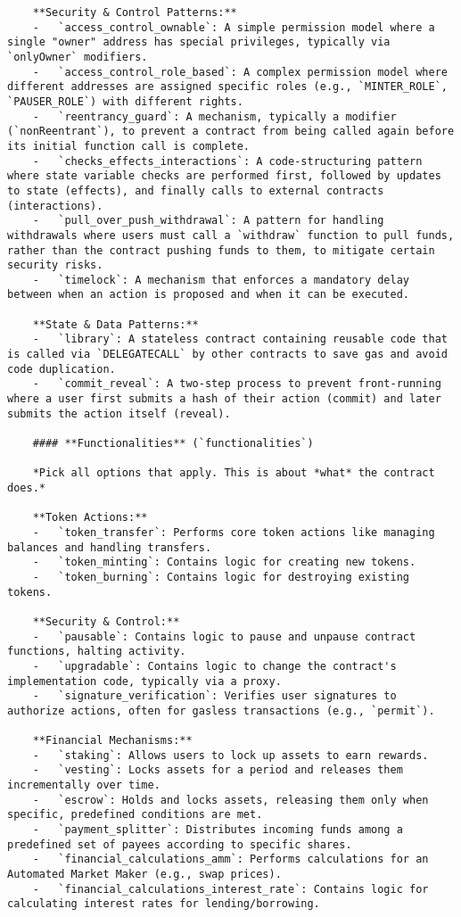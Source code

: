 \begin{lstlisting}
    **Security & Control Patterns:**
    -   `access_control_ownable`: A simple permission model where a single "owner" address has special privileges, typically via `onlyOwner` modifiers.
    -   `access_control_role_based`: A complex permission model where different addresses are assigned specific roles (e.g., `MINTER_ROLE`, `PAUSER_ROLE`) with different rights.
    -   `reentrancy_guard`: A mechanism, typically a modifier (`nonReentrant`), to prevent a contract from being called again before its initial function call is complete.
    -   `checks_effects_interactions`: A code-structuring pattern where state variable checks are performed first, followed by updates to state (effects), and finally calls to external contracts (interactions).
    -   `pull_over_push_withdrawal`: A pattern for handling withdrawals where users must call a `withdraw` function to pull funds, rather than the contract pushing funds to them, to mitigate certain security risks.
    -   `timelock`: A mechanism that enforces a mandatory delay between when an action is proposed and when it can be executed.

    **State & Data Patterns:**
    -   `library`: A stateless contract containing reusable code that is called via `DELEGATECALL` by other contracts to save gas and avoid code duplication.
    -   `commit_reveal`: A two-step process to prevent front-running where a user first submits a hash of their action (commit) and later submits the action itself (reveal).

    #### **Functionalities** (`functionalities`)

    *Pick all options that apply. This is about *what* the contract does.*

    **Token Actions:**
    -   `token_transfer`: Performs core token actions like managing balances and handling transfers.
    -   `token_minting`: Contains logic for creating new tokens.
    -   `token_burning`: Contains logic for destroying existing tokens.

    **Security & Control:**
    -   `pausable`: Contains logic to pause and unpause contract functions, halting activity.
    -   `upgradable`: Contains logic to change the contract's implementation code, typically via a proxy.
    -   `signature_verification`: Verifies user signatures to authorize actions, often for gasless transactions (e.g., `permit`).

    **Financial Mechanisms:**
    -   `staking`: Allows users to lock up assets to earn rewards.
    -   `vesting`: Locks assets for a period and releases them incrementally over time.
    -   `escrow`: Holds and locks assets, releasing them only when specific, predefined conditions are met.
    -   `payment_splitter`: Distributes incoming funds among a predefined set of payees according to specific shares.
    -   `financial_calculations_amm`: Performs calculations for an Automated Market Maker (e.g., swap prices).
    -   `financial_calculations_interest_rate`: Contains logic for calculating interest rates for lending/borrowing.


\end{lstlisting}

